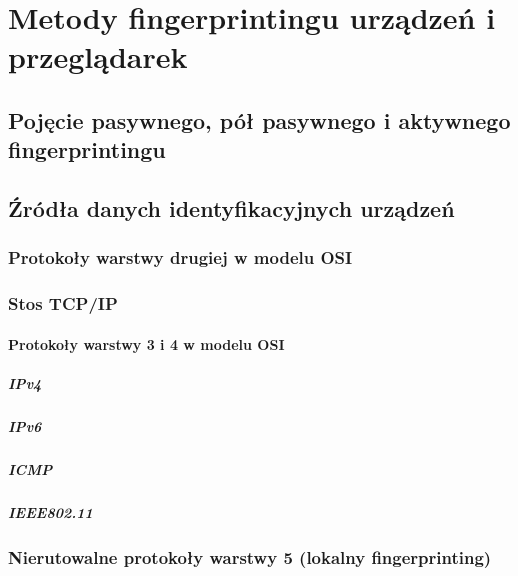 \chapter{Metody fingerprintingu urządzeń i przeglądarek}

\section{Pojęcie pasywnego, pół pasywnego i aktywnego fingerprintingu}

\section{Źródła danych identyfikacyjnych urządzeń}

\subsection{Protokoły warstwy drugiej w modelu OSI}

\subsection{Stos TCP/IP}

\subsubsection{Protokoły warstwy 3 i 4 w modelu OSI}

\paragraph{IPv4}

\paragraph{IPv6}

\paragraph{ICMP}

\paragraph{IEEE802.11}

\subsection{Nierutowalne protokoły warstwy 5 (lokalny fingerprinting)}

